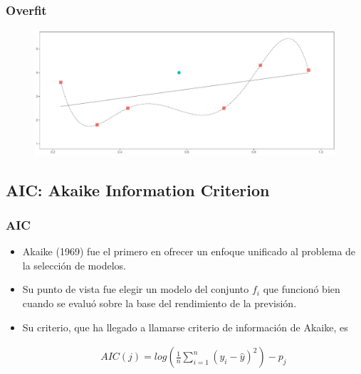 \documentclass[
  shownotes,
  xcolor={svgnames},
  hyperref={colorlinks,citecolor=DarkBlue,linkcolor=DarkRed,urlcolor=DarkBlue}
  , aspectratio=169]{beamer}
\begin{document}
\begin{frame}
\frametitle{Overfit}


        \begin{figure}[H] \centering
            \captionsetup{justification=centering}
              \includegraphics[scale=0.4]{figures/fig_1h.pdf}
 \end{figure}

\end{frame}

\subsection{AIC: Akaike Information Criterion}
\begin{frame}[fragile]
\frametitle{AIC}

\begin{itemize}

\item Akaike (1969) fue el primero en ofrecer un enfoque unificado al problema de la selección de modelos.

\item Su punto de vista fue elegir un modelo del conjunto $ {f_i} $ que funcionó bien cuando se evaluó sobre la base del rendimiento de la previsión. 

\item Su criterio, que ha llegado a llamarse criterio de información de Akaike, es

\begin{align}
AIC(j) = log \left( \frac{1}{n} \sum_{i=1}^n (y_i - \hat{y} )^2\right) - p_j
\end{align}



\end{itemize}
\end{frame}
\end{document}
